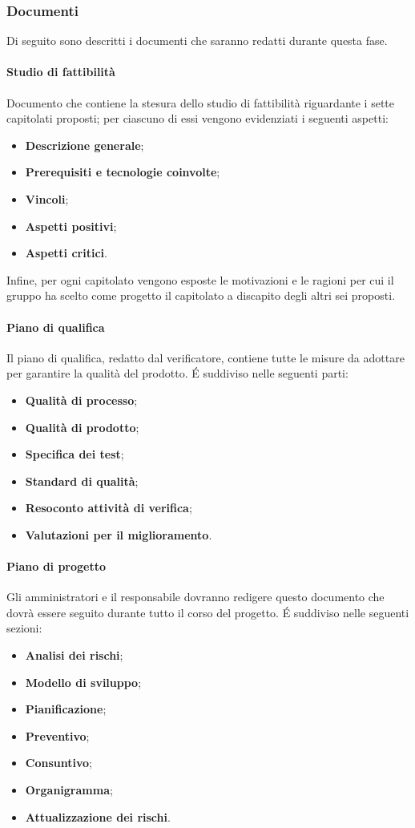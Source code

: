 \subsubsection{Documenti}
Di seguito sono descritti i documenti che saranno redatti durante questa fase.
\paragraph{Studio di fattibilità}
Documento che contiene la stesura dello studio di fattibilità riguardante i sette capitolati proposti; per ciascuno di essi vengono evidenziati i seguenti aspetti:
\begin{itemize}
    \item \textbf{Descrizione generale};
    \item \textbf{Prerequisiti e tecnologie coinvolte};
    \item \textbf{Vincoli};
    \item \textbf{Aspetti positivi};
    \item \textbf{Aspetti critici}.
\end{itemize}
Infine, per ogni capitolato vengono esposte le motivazioni e le ragioni per cui il gruppo ha scelto come progetto il capitolato \NomeProgetto{} a discapito degli altri sei proposti.\\
\paragraph{Piano di qualifica}
Il piano di qualifica, redatto dal verificatore, contiene tutte le misure da adottare per garantire la qualità del prodotto. \'E suddiviso nelle seguenti parti:
\begin{itemize}
\item \textbf{Qualità di processo};
\item \textbf{Qualità di prodotto};
\item \textbf{Specifica dei test};
\item \textbf{Standard di qualità};
\item \textbf{Resoconto attività di verifica};
\item \textbf{Valutazioni per il miglioramento}.
\end{itemize} 
\paragraph{Piano di progetto}
Gli amministratori e il responsabile dovranno redigere questo documento che dovrà essere seguito durante tutto il corso del progetto. \'E suddiviso nelle seguenti sezioni:
\begin{itemize}
    \item \textbf{Analisi dei rischi};
    \item \textbf{Modello di sviluppo};
   \item \textbf{Pianificazione};  
    \item \textbf{Preventivo};
    \item \textbf{Consuntivo};
    \item \textbf{Organigramma};
    \item \textbf{Attualizzazione dei rischi}. 
\end{itemize}
